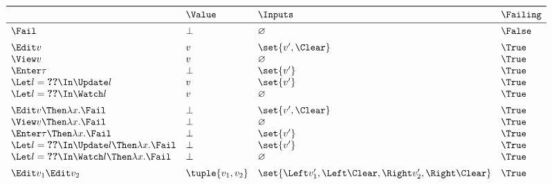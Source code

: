 \begin{equation*}
  \begin{array}{llll}
    \toprule
                                                         & \Value           & \Inputs                                                    & \Failing \\
    \midrule
    \Fail                                                & \bot             & \nothing                                                   & \False \\
    \addlinespace
    \Edit v                                              & v                & \set{v', \Clear}                                           & \True \\
    \View v                                              & v                & \nothing                                                   & \True \\
    \Enter \tau                                          & \bot             & \set{v'}                                                   & \True \\
    \Let l = \Ref v \In \Update l                        & v                & \set{v'}                                                   & \True \\
    \Let l = \Ref v \In \Watch l                         & v                & \nothing                                                   & \True \\
    \addlinespace
    \Edit v \Then \lambda x. \Fail                       & \bot             & \set{v', \Clear}                                           & \True \\
    \View v \Then \lambda x. \Fail                       & \bot             & \nothing                                                   & \True \\
    \Enter \tau \Then \lambda x. \Fail                   & \bot             & \set{v'}                                                   & \True \\
    \Let l = \Ref v \In \Update l \Then \lambda x. \Fail & \bot             & \set{v'}                                                   & \True \\
    \Let l = \Ref v \In \Watch l \Then \lambda x. \Fail  & \bot             & \nothing                                                   & \True \\
    \addlinespace
    \Edit v_1 \And \Edit v_2                             & \tuple{v_1, v_2} & \set{\Left v_1', \Left \Clear, \Right v_2', \Right \Clear} & \True \\

\end{array}
\end{equation*}
